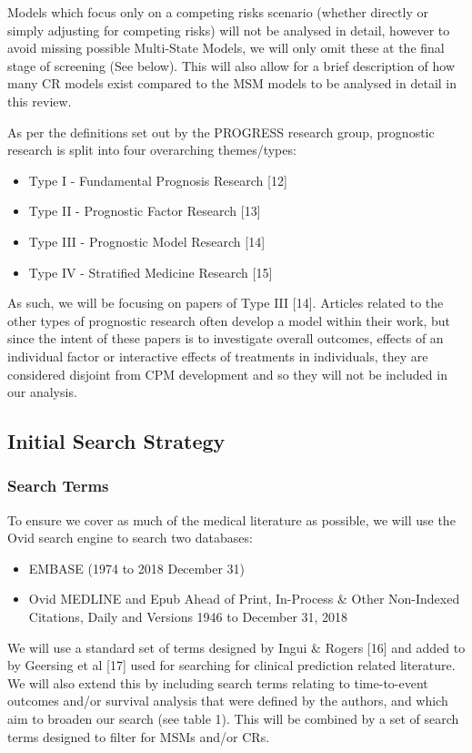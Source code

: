 \documentclass[12pt,twoside]{reedthesis}
\providecommand{\tightlist}{%
  \setlength{\itemsep}{0pt}\setlength{\parskip}{0pt}}
\begin{document}
Models which focus only on a competing risks scenario (whether directly or simply adjusting for competing risks) will not be analysed in detail, however to avoid missing possible Multi-State Models, we will only omit these at the final stage of screening (See below). This will also allow for a brief description of how many CR models exist compared to the MSM models to be analysed in detail in this review.

As per the definitions set out by the PROGRESS research group, prognostic research is split into four overarching themes/types:
\begin{itemize}
\tightlist
\item
  Type I - Fundamental Prognosis Research {[}12{]}
\item
  Type II - Prognostic Factor Research {[}13{]}
\item
  Type III - Prognostic Model Research {[}14{]}
\item
  Type IV - Stratified Medicine Research {[}15{]}
\end{itemize}
As such, we will be focusing on papers of Type III {[}14{]}. Articles related to the other types of prognostic research often develop a model within their work, but since the intent of these papers is to investigate overall outcomes, effects of an individual factor or interactive effects of treatments in individuals, they are considered disjoint from CPM development and so they will not be included in our analysis.

\hypertarget{initial-search-strategy}{%
\subsection{Initial Search Strategy}\label{initial-search-strategy}}

\hypertarget{search-terms}{%
\subsubsection{Search Terms}\label{search-terms}}

To ensure we cover as much of the medical literature as possible, we will use the Ovid search engine to search two databases:
\begin{itemize}
\tightlist
\item
  EMBASE (1974 to 2018 December 31)
\item
  Ovid MEDLINE and Epub Ahead of Print, In-Process \& Other Non-Indexed Citations, Daily and Versions 1946 to December 31, 2018
\end{itemize}
We will use a standard set of terms designed by Ingui \& Rogers {[}16{]} and added to by Geersing et al {[}17{]} used for searching for clinical prediction related literature. We will also extend this by including search terms relating to time-to-event outcomes and/or survival analysis that were defined by the authors, and which aim to broaden our search (see table 1). This will be combined by a set of search terms designed to filter for MSMs and/or CRs.
\end{document}
